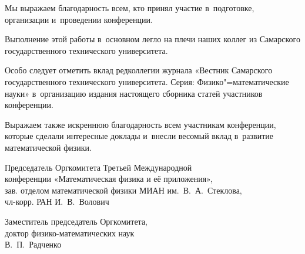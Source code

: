 Мы выражаем благодарность всем, кто принял участие в~подготовке, организации и~проведении конференции. 

Выполнение этой работы в~основном легло на плечи наших коллег из Самарского государственного технического университета. 

Особо следует отметить вклад редколлегии журнала «Вестник Самарского государственного технического университета. Серия: Физико"=математические науки» в~организацию издания настоящего сборника статей участников конференции. 

Выражаем также искреннюю благодарность всем участникам конференции, которые сделали интересные доклады и~внесли весомый вклад в~развитие математической физики.





\begin{flushright} \it \footnotesize

Председатель Оргкомитета Третьей Международной \\ 

конференции «Математическая физика и её приложения»,	\\

зав. отделом математической физики  МИАН им.~В.~А.~Стеклова, \\

чл-корр. РАН И.~В.~Волович

 \end{flushright}

 

 

 

\begin{flushright} \it \footnotesize

Заместитель председатель Оргкомитета,	\\

доктор физико-математических наук \\

В.~П.~Радченко

 \end{flushright}



\newpage



%

